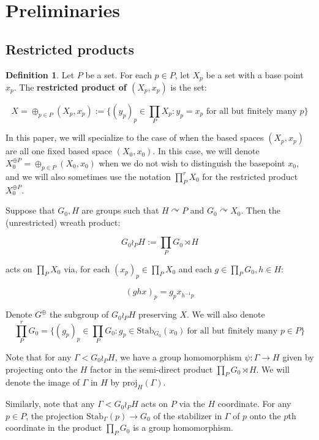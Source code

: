 \documentclass[12pt]{article}
\theoremstyle{definition}
\newtheorem{defn}[thm]{Definition}
\begin{document}
\section{Preliminaries}

\subsection{Restricted products}
\label{res prod}

\begin{defn}
    \label{restricted product}
    Let $P$ be a set. For each $p \in P$, let $X_p$ be a set with a base point $x_p$.  The \textbf{restricted product of $(X_p, x_p)$} is the set: 

    $$X = \oplus_{p \in P}(X_p, x_p) := \{(y_p)_p \in \prod_P X_p : y_p = x_p \text{ for all but finitely many } p\}$$
\end{defn}

In this paper, we will specialize to the case of when the based spaces $(X_p, x_p)$ are all one fixed based space $(X_0, x_0)$. In this case, we will denote $X_0^{\oplus P} = \oplus_{p \in P}(X_0, x_0)$ when we do not wish to distinguish the basepoint $x_0$, and we will also sometimes use the notation $\prod^r_P X_0$ for the restricted product $X_0^{\oplus P}$.

Suppose that $G_0, H$ are groups such that  $H \curvearrowright P$ and $G_0 \curvearrowright X_0$. Then the (unrestricted) wreath product: 

    $$G_0 \wr_P H := \prod_P G_0 \rtimes H$$

    acts on $\prod_P X_0$ via, for each $(x_p)_p \in \prod_P X_0$ and each $g \in \prod_P G_0, h \in H$: 

    $$(ghx)_p = g_p x_{h^{-1}p}$$

    Denote $G^{\oplus}$ the subgroup of $G_0 \wr_P H$ preserving $X$. We will also denote $$\prod_P^r G_0 = \{(g_p)_p \in \prod_P G_0 : g_p \in \mathrm{Stab}_{G_0}(x_0) \ \text{for all but finitely many $p \in P$}\}$$

Note that for any $\Gamma < G_0 \wr_P H$, we have a group homomorphism $\psi: \Gamma \to H$ given by projecting onto the $H$ factor in the semi-direct product $\prod_P G_0 \rtimes H$. We will denote the image of $\Gamma$ in $H$ by $\mathrm{proj}_H(\Gamma)$. 

Similarly, note that any $\Gamma < G_0 \wr_P H$ acts on $P$ via the $H$ coordinate. For any $p \in P$, the projection $\mathrm{Stab}_{\Gamma}(p) \to G_0$ of the stabilizer in $\Gamma$ of $p$ onto the $p$th coordinate in the product $\prod_P G_0$ is a group homomorphism. 
\end{document}
